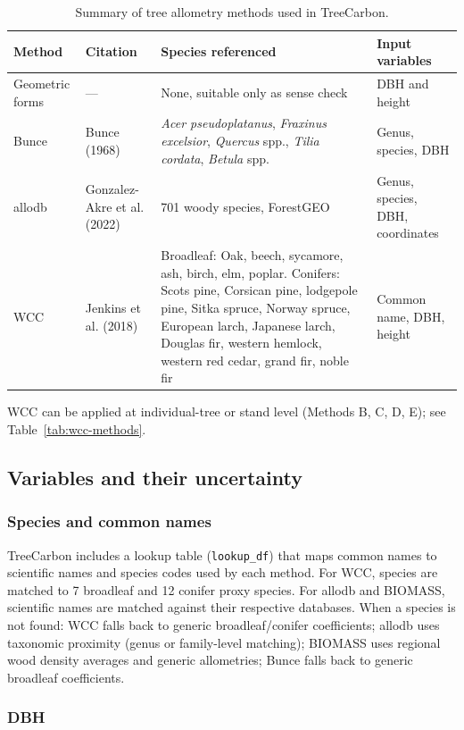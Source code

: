 \documentclass[12pt,a4paper]{article}
\begin{document}
\begin{table}[htbp]
\centering
\caption{Summary of tree allometry methods used in TreeCarbon.}
\label{tab:allometry}
\small
\begin{tabularx}{\linewidth}{@{}l l X X@{}}
\toprule
Method & Citation & Species referenced & Input variables \\
\midrule
Geometric forms & --- & None, suitable only as sense check & DBH and height \\
Bunce & Bunce (1968) & \textit{Acer pseudoplatanus}, \textit{Fraxinus excelsior}, \textit{Quercus} spp., \textit{Tilia cordata}, \textit{Betula} spp. & Genus, species, DBH \\
allodb & Gonzalez-Akre et al. (2022) & 701 woody species, ForestGEO & Genus, species, DBH, coordinates \\
WCC & Jenkins et al. (2018) & Broadleaf: Oak, beech, sycamore, ash, birch, elm, poplar. Conifers: Scots pine, Corsican pine, lodgepole pine, Sitka spruce, Norway spruce, European larch, Japanese larch, Douglas fir, western hemlock, western red cedar, grand fir, noble fir & Common name, DBH, height \\
\bottomrule
\end{tabularx}
\medskip
\raggedright
\footnotesize WCC can be applied at individual-tree or stand level (Methods B, C, D, E); see Table~\ref{tab:wcc-methods}.
\end{table}

\subsection{Variables and their uncertainty}

\subsubsection{Species and common names}

TreeCarbon includes a lookup table (\texttt{lookup\_df}) that maps common names to scientific names and species codes used by each method. For WCC, species are matched to 7 broadleaf and 12 conifer proxy species. For allodb and BIOMASS, scientific names are matched against their respective databases. When a species is not found: WCC falls back to generic broadleaf/conifer coefficients; allodb uses taxonomic proximity (genus or family-level matching); BIOMASS uses regional wood density averages and generic allometries; Bunce falls back to generic broadleaf coefficients.

\subsubsection{DBH}
\end{document}
